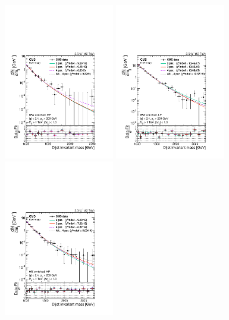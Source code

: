 \begin{figure}[htb]
\centering
\includegraphics[width=0.43\textwidth]{figures/analysis/search1/AN-15-211//ftest/no5par/WWHP_fitComp.pdf}
\includegraphics[width=0.43\textwidth]{figures/analysis/search1/AN-15-211//ftest/no5par/WWLP_fitComp.pdf}\\
\includegraphics[width=0.43\textwidth]{figures/analysis/search1/AN-15-211//ftest/no5par/WZHP_fitComp.pdf}

\end{figure}
